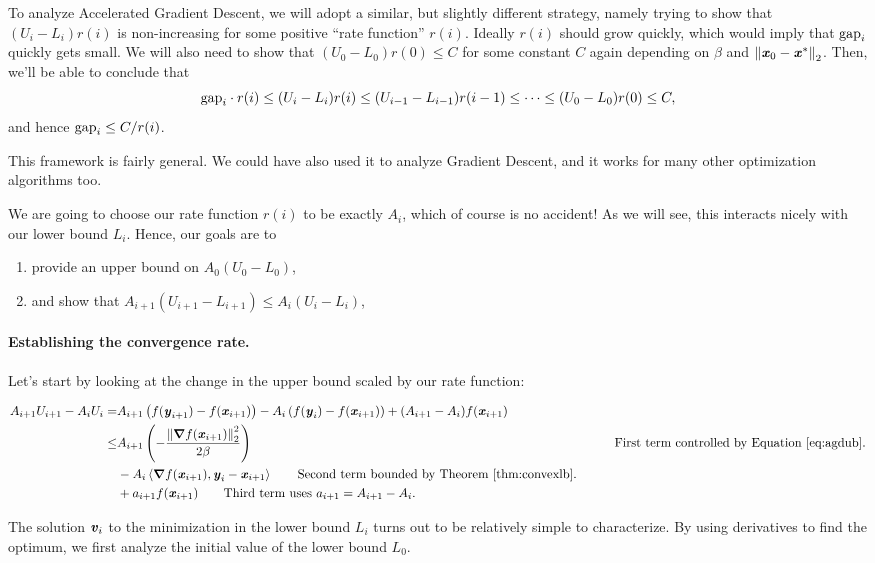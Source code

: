 To analyze Accelerated Gradient Descent, we will adopt a similar, but
slightly different strategy, namely trying to show that $(U_i - L_i) r(i)$
is non-increasing for some positive ``rate function'' $r(i)$. Ideally $r(i)$ should
grow quickly, which would imply that $\text{gap}_i$ quickly gets small.
We will also need to show that $(U_0 - L_0) r(0) \leq C$ for some constant
$C$ again depending on $\beta$ and $\left\| \boldsymbol{\mathit{x}}_0 - \boldsymbol{\mathit{x}}^* \right\|_2$.
%
Then, we'll be able to conclude that
\[
\text{gap}_i \cdot r(i) \leq (U_i - L_i) r(i) \leq (U_{i-1} - L_{i-1}) r(i-1) \leq
\cdots \leq (U_0 - L_0) r(0) \leq C,
\]
and hence $\text{gap}_i \leq C/r(i)$.

This framework is fairly general. We could have also used it to
analyze Gradient Descent, and it works for many other optimization
algorithms too.

We are going to choose our rate function $r(i)$ to be exactly $A_i$,
which of course is no accident!
As we will see, this interacts nicely with our lower
bound $L_i$.
Hence, our goals are to
\begin{enumerate}
\item provide an upper bound on $A_0 (U_0 - L_0)$,
\item and show that $A_{i+1} (U_{i+1} - L_{i+1})  \leq A_{i} (U_{i} - L_{i}) $,
\end{enumerate}

\paragraph{Establishing the convergence rate.}
Let's start by looking at the change in the upper bound scaled by our
rate function:

\begin{align}
  \label{eq:ubgap}
  A_{i+1}U_{i+1} - A_i U_i
  =&
  A_{i+1}\left( f(\yy_{i+1}) - f(\xx_{i+1}) \right)
  -
  A_{i}\left( f(\yy_{i}) - f(\xx_{i+1}) \right)
  +
  (A_{i+1}-A_{i}) f(\xx_{i+1})
\\
\leq &
     A_{i+1}\left(
     - \frac{\norm{\grad  f(\xx_{i+1})}_2^2}{2\beta}
       \right)
       & \tag*{First term controlled by Equation~\eqref{eq:agdub}.}
  \\
  &-
     A_{i}
    \ip{\grad f(\xx_{i+1}), \yy_{i} - \xx_{i+1}  }
    \tag*{Second term bounded by Theorem~\ref{thm:convexlb}.}
  \\
   &+ a_{i+1} f(\xx_{i+1})
     \tag*{Third term uses $a_{i+1} = A_{i+1}-A_{i}$.}
\end{align}

The solution $\boldsymbol{\mathit{v}}_i$ to the minimization in the lower bound $L_i$
turns out to be relatively simple to characterize.
By using derivatives to find the optimum, we first analyze the initial
value of the lower bound $L_0$.

